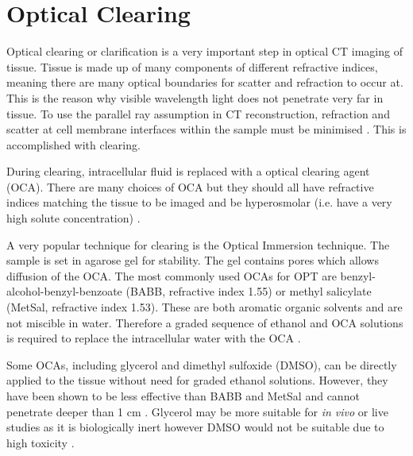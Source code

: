 	
	
	
	
	
	\section{Optical Clearing}
	\label{sec:clearing}
	
	Optical clearing or clarification is a very important step in optical CT imaging of tissue. Tissue is made up of many components of different refractive indices, meaning there are many optical boundaries for scatter and refraction to occur at. This is the reason why visible wavelength light does not penetrate very far in tissue. To use the parallel ray assumption  in CT reconstruction, refraction and scatter at cell membrane interfaces within the sample must be minimised \cite{Oldham:2006}.  This is accomplished with clearing.
	
	During clearing, intracellular  fluid is replaced with a optical clearing agent (OCA). There are many choices of OCA but they should all have refractive indices matching the tissue to be imaged and be hyperosmolar (i.e. have a very high solute concentration) \cite{tuchin2007tissue}.
	
	
	A very popular technique for clearing is the Optical Immersion technique. The sample is set in agarose gel for stability. The gel contains pores which allows diffusion of the OCA. The most commonly used OCAs for OPT are benzyl-alcohol-benzyl-benzoate (BABB, refractive index 1.55) or methyl salicylate (MetSal, refractive index 1.53). These are both aromatic organic solvents and are not miscible in water. Therefore a graded sequence of ethanol and OCA solutions is required to replace the intracellular water with the OCA \cite{Oldham:2006}. 
	
	Some OCAs, including glycerol and dimethyl sulfoxide (DMSO), can be directly applied to the tissue without need for graded ethanol solutions. However, they have been shown to be less effective than BABB and MetSal and cannot penetrate deeper than 1 cm \cite{Oldham:2006}.  Glycerol may be more suitable for \textit{in vivo} or live studies as it is biologically inert however DMSO would not be suitable due to high toxicity \cite{Wen:2009is}.
	
	
